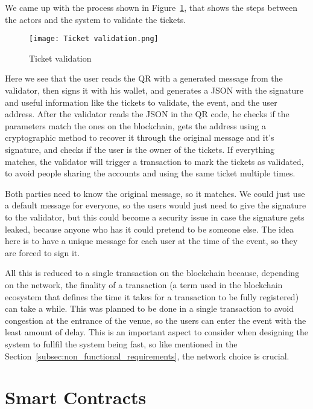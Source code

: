 We came up with the process shown in Figure~\ref{fig:ticket_validation}, that
shows the steps between the actors and the system to validate the tickets.

\begin{figure}[H]
	\texttt{[image: Ticket validation.png]}
	\centering
	\caption{Ticket validation}\label{fig:ticket_validation}
\end{figure}

Here we see that the user reads the QR with a generated message from the
validator, then signs it with his wallet, and generates a JSON with the
signature and useful information like the tickets to validate, the event, and
the user address. After the validator reads the JSON in the QR code, he checks
if the parameters match the ones on the blockchain, gets the address using a
cryptographic method to recover it through the original message and it's
signature, and checks if the user is the owner of the tickets. If everything
matches, the validator will trigger a transaction to mark the tickets as
validated, to avoid people sharing the accounts and using the same ticket
multiple times.

Both parties need to know the original message, so it matches. We could just
use a default message for everyone, so the users would just need to give the
signature to the validator, but this could become a security issue in case the
signature gets leaked, because anyone who has it could pretend to be someone
else. The idea here is to have a unique message for each user at the time of
the event, so they are forced to sign it.

All this is reduced to a single transaction on the blockchain because,
depending on the network, the finality of a transaction (a term used in the
blockchain ecosystem that defines the time it takes for a transaction to be
fully registered) can take a while. This was planned to be done in a single
transaction to avoid congestion at the entrance of the venue, so the users can
enter the event with the least amount of delay. This is an important aspect to
consider when designing the system to fullfil the system being fast, so like
mentioned in the Section~\ref{subsec:non_functional_requirements}, the network
choice is crucial.

\section{Smart Contracts}\label{sec:smart_contracts}

